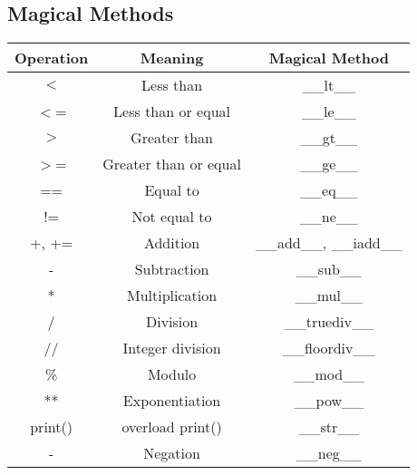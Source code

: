 \subsection{Magical Methods}
    \begin{tabular}{c | c | c}
        Operation   & Meaning               & Magical Method\\
        \hline \hline
        $<$         & Less than             & \_\_lt\_\_\\
        $<$=        & Less than or equal    & \_\_le\_\_\\
        $>$         & Greater than          & \_\_gt\_\_\\
        $>$=        & Greater than or equal & \_\_ge\_\_\\
        ==          & Equal to              & \_\_eq\_\_\\
        !=          & Not equal to          & \_\_ne\_\_\\
        +, +=       & Addition              & \_\_add\_\_, \_\_iadd\_\_\\
        -           & Subtraction           & \_\_sub\_\_\\
        *           & Multiplication        & \_\_mul\_\_\\
        /           & Division              & \_\_truediv\_\_\\
        //          & Integer division      & \_\_floordiv\_\_\\
        \%          & Modulo                & \_\_mod\_\_\\
        **          & Exponentiation        & \_\_pow\_\_\\
        print()     & overload print()      & \_\_str\_\_\\
        -           & Negation              & \_\_neg\_\_
    \end{tabular}